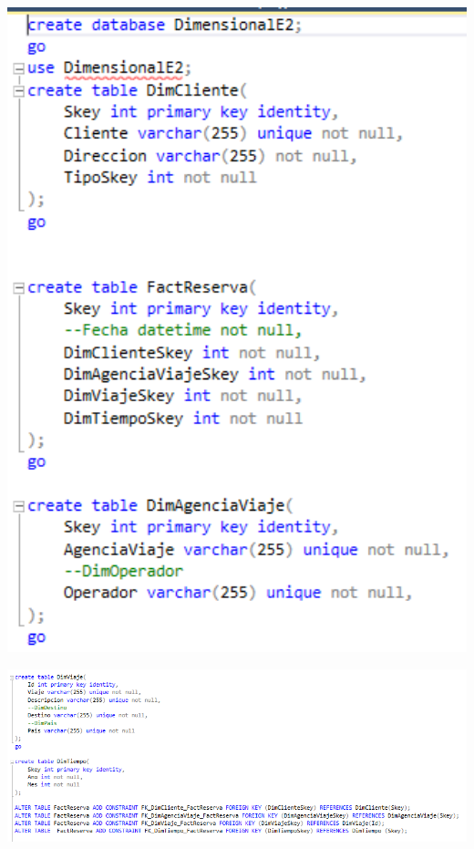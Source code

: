	\begin{center}
	\includegraphics[width=17cm]{./Imagenes/24}
	\end{center}	

	\begin{center}
	\includegraphics[width=17cm]{./Imagenes/25}
	\end{center}	